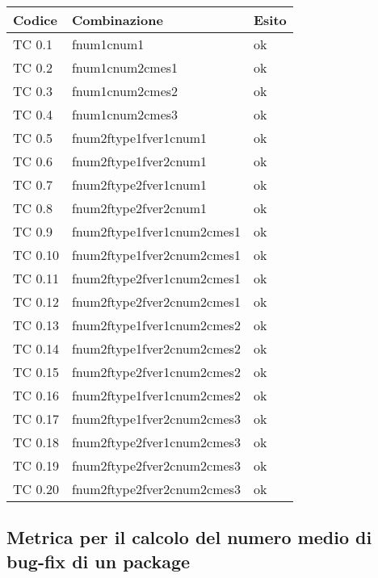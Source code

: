 \begin{tabular}{|p{3cm}|p{7cm}|p{3cm}|}
	\hline
	\rowcolor{Gray}
	\textbf{Codice} & \textbf{Combinazione} & \textbf{Esito}\tabularnewline
	\hline
	TC 0.1 			& fnum1cnum1 					& ok \tabularnewline
	\hline
	TC 0.2 			& fnum1cnum2cmes1 				& ok \tabularnewline
	\hline
	TC 0.3 			& fnum1cnum2cmes2 				& ok \tabularnewline
	\hline
	TC 0.4 			& fnum1cnum2cmes3 				& ok \tabularnewline
	\hline
	TC 0.5 			& fnum2ftype1fver1cnum1 			& ok \tabularnewline
	\hline
	TC 0.6 			& fnum2ftype1fver2cnum1				& ok \tabularnewline
	\hline
	TC 0.7 			& fnum2ftype2fver1cnum1 			& ok \tabularnewline
	\hline
	TC 0.8 			& fnum2ftype2fver2cnum1 			& ok \tabularnewline
	\hline
	TC 0.9 			& fnum2ftype1fver1cnum2cmes1 			& ok \tabularnewline
	\hline
	TC 0.10 		& fnum2ftype1fver2cnum2cmes1 			& ok \tabularnewline
	\hline
	TC 0.11 		& fnum2ftype2fver1cnum2cmes1 			& ok \tabularnewline
	\hline
	TC 0.12			& fnum2ftype2fver2cnum2cmes1 			& ok \tabularnewline
	\hline
	TC 0.13			& fnum2ftype1fver1cnum2cmes2 			& ok \tabularnewline
	\hline
	TC 0.14			& fnum2ftype1fver2cnum2cmes2 			& ok \tabularnewline
	\hline
	TC 0.15			& fnum2ftype2fver1cnum2cmes2 			& ok \tabularnewline
	\hline
	TC 0.16			& fnum2ftype1fver1cnum2cmes2 			& ok \tabularnewline
	\hline
	TC 0.17			& fnum2ftype1fver2cnum2cmes3 			& ok \tabularnewline
	\hline
	TC 0.18			& fnum2ftype2fver1cnum2cmes3 			& ok \tabularnewline
	\hline
	TC 0.19			& fnum2ftype2fver2cnum2cmes3 			& ok \tabularnewline
	\hline
	TC 0.20			& fnum2ftype2fver2cnum2cmes3 			& ok \tabularnewline
	\hline
\end{tabular}
\clearpage




\subsection{Metrica per il calcolo del numero medio di bug-fix di un package}

